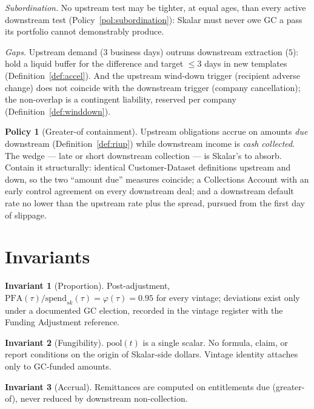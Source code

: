 \documentclass[11pt, a4paper]{article}
\theoremstyle{definition}
\newtheorem{invariant}{Invariant}
\newtheorem{policy}{Policy}
\newcommand{\PFA}{\mathrm{PFA}}                   %
\newcommand{\pool}{\mathrm{pool}}                 %
\newcommand{\spend}{\mathrm{spend}}               %
\begin{document}
\emph{Subordination.} No upstream test may be tighter, at equal ages, than every active downstream test (Policy~\ref{pol:subordination}): Skalar must never owe GC a pass its portfolio cannot demonstrably produce.

\emph{Gaps.} Upstream demand ($3$ business days) outruns downstream extraction ($5$): hold a liquid buffer for the difference and target $\leq 3$ days in new templates (Definition~\ref{def:accel}). And the upstream wind-down trigger (recipient adverse change) does not coincide with the downstream trigger (company cancellation); the non-overlap is a contingent liability, reserved per company (Definition~\ref{def:winddown}).

\begin{policy}[Greater-of containment]\label{pol:containment}
Upstream obligations accrue on amounts \emph{due} downstream (Definition~\ref{def:riup}) while downstream income is \emph{cash collected}. The wedge --- late or short downstream collection --- is Skalar's to absorb. Contain it structurally: identical Customer-Dataset definitions upstream and down, so the two ``amount due'' measures coincide; a Collections Account with an early control agreement on every downstream deal; and a downstream default rate no lower than the upstream rate plus the spread, pursued from the first day of slippage.
\end{policy}

\section{Invariants}\label{sec:invariants}

\begin{invariant}[Proportion]\label{inv:prop}
Post-adjustment, $\PFA(\tau) / \spend_{sk}(\tau) = \varphi(\tau) = 0.95$ for every vintage; deviations exist only under a documented GC election, recorded in the vintage register with the Funding Adjustment reference.
\end{invariant}

\begin{invariant}[Fungibility]\label{inv:fung}
$\pool(t)$ is a single scalar. No formula, claim, or report conditions on the origin of Skalar-side dollars. Vintage identity attaches only to GC-funded amounts.
\end{invariant}

\begin{invariant}[Accrual]\label{inv:accrual}
Remittances are computed on entitlements due (greater-of), never reduced by downstream non-collection.
\end{invariant}
\end{document}
